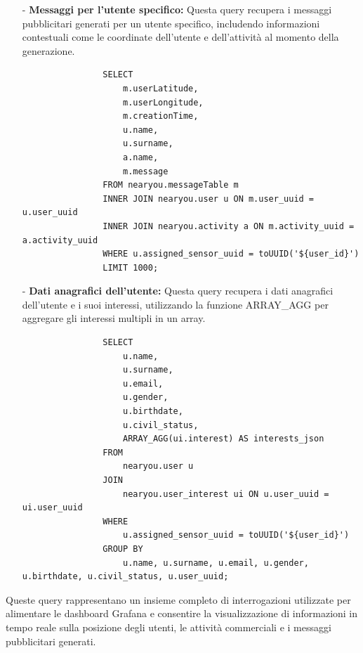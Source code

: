 \documentclass[10pt]{article}
\begin{document}
\begin{itemize}
\begin{itemize}
                \item[-] \textbf{Messaggi per l'utente specifico:}
                Questa query recupera i messaggi pubblicitari generati per un utente specifico, includendo informazioni contestuali come le coordinate dell'utente e dell'attività al momento della generazione.
                
                \begin{lstlisting}
                SELECT     
                    m.userLatitude, 
                    m.userLongitude, 
                    m.creationTime, 
                    u.name, 
                    u.surname, 
                    a.name, 
                    m.message 
                FROM nearyou.messageTable m
                INNER JOIN nearyou.user u ON m.user_uuid = u.user_uuid 
                INNER JOIN nearyou.activity a ON m.activity_uuid = a.activity_uuid 
                WHERE u.assigned_sensor_uuid = toUUID('${user_id}')
                LIMIT 1000;
                \end{lstlisting}
                
                \item[-] \textbf{Dati anagrafici dell'utente:}
                Questa query recupera i dati anagrafici dell'utente e i suoi interessi, utilizzando la funzione ARRAY_AGG per aggregare gli interessi multipli in un array.
                
                \begin{lstlisting}
                SELECT 
                    u.name, 
                    u.surname, 
                    u.email, 
                    u.gender, 
                    u.birthdate, 
                    u.civil_status, 
                    ARRAY_AGG(ui.interest) AS interests_json
                FROM 
                    nearyou.user u
                JOIN 
                    nearyou.user_interest ui ON u.user_uuid = ui.user_uuid
                WHERE 
                    u.assigned_sensor_uuid = toUUID('${user_id}')
                GROUP BY 
                    u.name, u.surname, u.email, u.gender, u.birthdate, u.civil_status, u.user_uuid;
                \end{lstlisting}
            \end{itemize}
        \end{itemize}
        Queste query rappresentano un insieme completo di interrogazioni utilizzate per alimentare le dashboard Grafana e consentire la visualizzazione di informazioni in tempo reale sulla posizione degli utenti, le attività commerciali e i messaggi pubblicitari generati.
\end{document}
